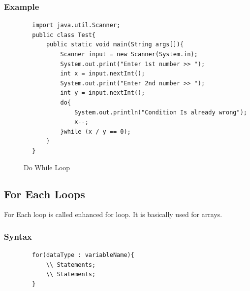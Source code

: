 \documentclass[openany]{book}  %
\begin{document}
\subsubsection{Example}
\begin{center}
    \footnotesize
    \begin{verbatim}
        import java.util.Scanner;
        public class Test{
            public static void main(String args[]){
                Scanner input = new Scanner(System.in);
                System.out.print("Enter 1st number >> ");
                int x = input.nextInt();
                System.out.print("Enter 2nd number >> ");
                int y = input.nextInt();
                do{
                    System.out.println("Condition Is already wrong");
                    x--;
                }while (x / y == 0);
            }
        }
    \end{verbatim}
\end{center}
% 
% 
\begin{figure}[htbp]
    \begin{center}
        \caption{Do While Loop\cite{Ref3}}
    \end{center}
\end{figure}
% 
% 

\newpage

\subsection{For Each Loops}
For Each loop is called enhanced for loop. It is basically used
for arrays.
% 
% 
\subsubsection{Syntax}
\begin{center}
    \begin{verbatim}
        for(dataType : variableName){
            \\ Statements;
            \\ Statements;
        }
    \end{verbatim}
\end{center}
% 
% 
\end{document}

